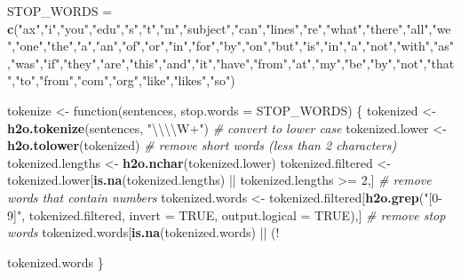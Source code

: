 \documentclass[]{article}
\newenvironment{Shaded}{\begin{snugshade}}{\end{snugshade}}
\newcommand{\KeywordTok}[1]{\textcolor[rgb]{0.13,0.29,0.53}{\textbf{{#1}}}}
\newcommand{\DataTypeTok}[1]{\textcolor[rgb]{0.13,0.29,0.53}{{#1}}}
\newcommand{\DecValTok}[1]{\textcolor[rgb]{0.00,0.00,0.81}{{#1}}}
\newcommand{\CharTok}[1]{\textcolor[rgb]{0.31,0.60,0.02}{{#1}}}
\newcommand{\StringTok}[1]{\textcolor[rgb]{0.31,0.60,0.02}{{#1}}}
\newcommand{\CommentTok}[1]{\textcolor[rgb]{0.56,0.35,0.01}{\textit{{#1}}}}
\newcommand{\OtherTok}[1]{\textcolor[rgb]{0.56,0.35,0.01}{{#1}}}
\newcommand{\NormalTok}[1]{{#1}}
\begin{document}
\begin{Shaded}
\begin{Highlighting}[]
\NormalTok{STOP_WORDS =}\StringTok{ }\KeywordTok{c}\NormalTok{(}\StringTok{"ax"}\NormalTok{,}\StringTok{"i"}\NormalTok{,}\StringTok{"you"}\NormalTok{,}\StringTok{"edu"}\NormalTok{,}\StringTok{"s"}\NormalTok{,}\StringTok{"t"}\NormalTok{,}\StringTok{"m"}\NormalTok{,}\StringTok{"subject"}\NormalTok{,}\StringTok{"can"}\NormalTok{,}\StringTok{"lines"}\NormalTok{,}\StringTok{"re"}\NormalTok{,}\StringTok{"what"}\NormalTok{,}\StringTok{"there"}\NormalTok{,}\StringTok{"all"}\NormalTok{,}\StringTok{"we"}\NormalTok{,}\StringTok{"one"}\NormalTok{,}\StringTok{"the"}\NormalTok{,}\StringTok{"a"}\NormalTok{,}\StringTok{"an"}\NormalTok{,}\StringTok{"of"}\NormalTok{,}\StringTok{"or"}\NormalTok{,}\StringTok{"in"}\NormalTok{,}\StringTok{"for"}\NormalTok{,}\StringTok{"by"}\NormalTok{,}\StringTok{"on"}\NormalTok{,}\StringTok{"but"}\NormalTok{,}\StringTok{"is"}\NormalTok{,}\StringTok{"in"}\NormalTok{,}\StringTok{"a"}\NormalTok{,}\StringTok{"not"}\NormalTok{,}\StringTok{"with"}\NormalTok{,}\StringTok{"as"}\NormalTok{,}\StringTok{"was"}\NormalTok{,}\StringTok{"if"}\NormalTok{,}\StringTok{"they"}\NormalTok{,}\StringTok{"are"}\NormalTok{,}\StringTok{"this"}\NormalTok{,}\StringTok{"and"}\NormalTok{,}\StringTok{"it"}\NormalTok{,}\StringTok{"have"}\NormalTok{,}\StringTok{"from"}\NormalTok{,}\StringTok{"at"}\NormalTok{,}\StringTok{"my"}\NormalTok{,}\StringTok{"be"}\NormalTok{,}\StringTok{"by"}\NormalTok{,}\StringTok{"not"}\NormalTok{,}\StringTok{"that"}\NormalTok{,}\StringTok{"to"}\NormalTok{,}\StringTok{"from"}\NormalTok{,}\StringTok{"com"}\NormalTok{,}\StringTok{"org"}\NormalTok{,}\StringTok{"like"}\NormalTok{,}\StringTok{"likes"}\NormalTok{,}\StringTok{"so"}\NormalTok{)}

\NormalTok{tokenize <-}\StringTok{ }\NormalTok{function(sentences, }\DataTypeTok{stop.words =} \NormalTok{STOP_WORDS) \{}
  \NormalTok{tokenized <-}\StringTok{ }\KeywordTok{h2o.tokenize}\NormalTok{(sentences, }\StringTok{"}\CharTok{\textbackslash{}\textbackslash{}\textbackslash{}\textbackslash{}}\StringTok{W+"}\NormalTok{)}
  \CommentTok{# convert to lower case}
  \NormalTok{tokenized.lower <-}\StringTok{ }\KeywordTok{h2o.tolower}\NormalTok{(tokenized)}
  \CommentTok{# remove short words (less than 2 characters)}
  \NormalTok{tokenized.lengths <-}\StringTok{ }\KeywordTok{h2o.nchar}\NormalTok{(tokenized.lower)}
  \NormalTok{tokenized.filtered <-}\StringTok{ }\NormalTok{tokenized.lower[}\KeywordTok{is.na}\NormalTok{(tokenized.lengths) ||}\StringTok{  }\NormalTok{tokenized.lengths >=}\StringTok{ }\DecValTok{2}\NormalTok{,]}
  \CommentTok{# remove words that contain numbers}
  \NormalTok{tokenized.words <-}\StringTok{ }\NormalTok{tokenized.filtered[}\KeywordTok{h2o.grep}\NormalTok{(}\StringTok{"[0-9]"}\NormalTok{, tokenized.filtered, }\DataTypeTok{invert =} \OtherTok{TRUE}\NormalTok{, }\DataTypeTok{output.logical =} \OtherTok{TRUE}\NormalTok{),]}
  \CommentTok{# remove stop words}
  \NormalTok{tokenized.words[}\KeywordTok{is.na}\NormalTok{(tokenized.words) ||}\StringTok{ }\NormalTok{(!}\StringTok{ }\NormalTok{tokenized.words %in%}\StringTok{ }\NormalTok{STOP_WORDS),]}
\NormalTok{\}}

}
\end{Highlighting}
\end{Shaded}
\end{document}
